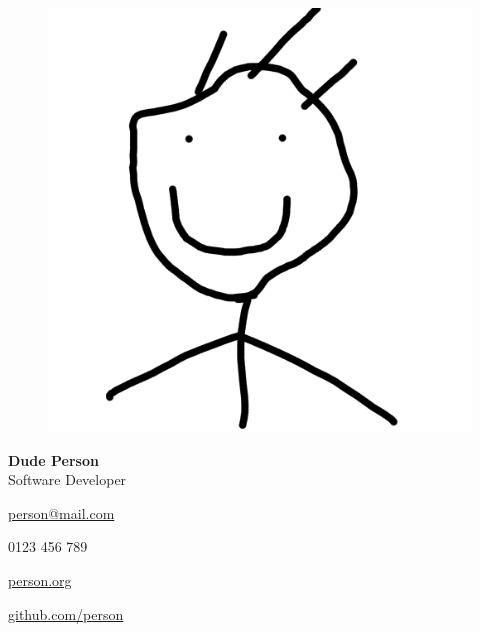 \begin{multicols}{2}

\iftrue %
\begin{figure}
	\includegraphics[width=0.25\linewidth, height=0.25\linewidth]{photo.png}
\end{figure}
\fi

\begin{flushright}
    {\Huge \bfseries Dude Person}\\
	Software Developer

	\columnbreak
\end{flushright}
\par

\icemail \large{\href{mailto:person@mail.com}{person@mail.com}}

\icphone \large{0123 456 789}

\icwebsite \large{\href{https://person.org}{person.org}}\

\icgithub \large{\href{https://github.com/person}{github.com/person}}

\end{multicols}

